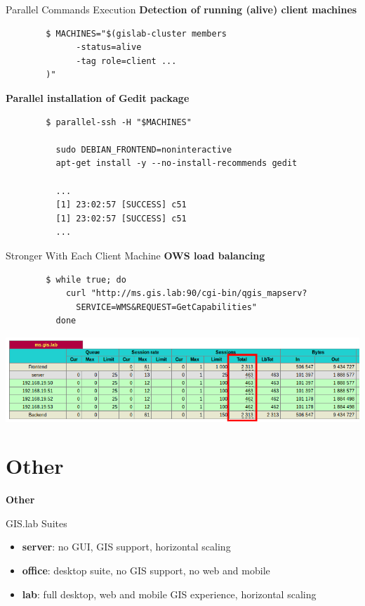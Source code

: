 \documentclass[12pt]{beamer}
\begin{document}
\begin{frame}[fragile]{Parallel Commands Execution}
	\textbf{Detection of running (alive) client machines}
	\lstset{language=sh}
	\begin{lstlisting}
		$ MACHINES="$(gislab-cluster members
			  -status=alive
			  -tag role=client ...
		)"
	\end{lstlisting}
	
	\textbf{Parallel installation of Gedit package}
	\begin{lstlisting}
		$ parallel-ssh -H "$MACHINES"

		  sudo DEBIAN_FRONTEND=noninteractive
		  apt-get install -y --no-install-recommends gedit
		  
		  ...
		  [1] 23:02:57 [SUCCESS] c51
		  [1] 23:02:57 [SUCCESS] c51
		  ...
	\end{lstlisting}
\end{frame}

\begin{frame}[fragile]{Stronger With Each Client Machine}
	\textbf{OWS load balancing}

	\lstset{language=sh}
	\begin{lstlisting}
		$ while true; do
		    curl "http://ms.gis.lab:90/cgi-bin/qgis_mapserv?
		      SERVICE=WMS&REQUEST=GetCapabilities"
		  done
	\end{lstlisting}
	\begin{center}
		\includegraphics[keepaspectratio=true,width=\textwidth]{images/lb-stats.png}
	\end{center}
\end{frame}

\section{Other}
\begin{frame}
	\begin{center}
		\LARGE\textbf{Other}
	\end{center}
\end{frame}

\begin{frame}{GIS.lab Suites}
	\begin{itemize}
		\item \textbf{server}: no GUI, GIS support, horizontal scaling
		\item \textbf{office}: desktop suite, no GIS support, no web and mobile
		\item \textbf{lab}: full desktop, web and mobile GIS experience, horizontal scaling
	\end{itemize}
\end{frame}
\end{document}
